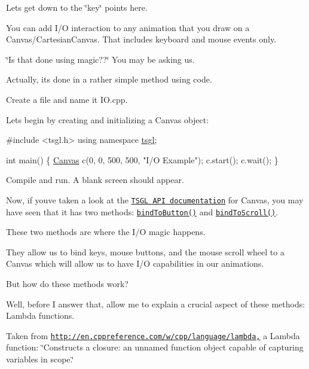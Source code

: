 Let\textquotesingle{}s get down to the \char`\"{}key\char`\"{} points here.

You can add I/\+O interaction to any animation that you draw on a Canvas/\+Cartesian\+Canvas. That includes keyboard and mouse events only.

\char`\"{}\+Is that done using magic??\char`\"{} You may be asking us.

Actually, it\textquotesingle{}s done in a rather simple method using code.

Create a file and name it I\+O.\+cpp.

Let\textquotesingle{}s begin by creating and initializing a Canvas object\+:


\begin{DoxyCode}
\textcolor{preprocessor}{#include <tsgl.h>}
\textcolor{keyword}{using namespace }\hyperlink{namespacetsgl}{tsgl};

\textcolor{keywordtype}{int} main() \{
  \hyperlink{classtsgl_1_1_canvas}{Canvas} c(0, 0, 500, 500, \textcolor{stringliteral}{"I/O Example"});
  c.start();
  c.wait();
\}
\end{DoxyCode}


Compile and run. A blank screen should appear.

Now, if you\textquotesingle{}ve taken a look at the \href{http://calvin-cs.github.io/TSGL/html/index.html}{\tt T\+S\+G\+L A\+P\+I documentation} for Canvas, you may have seen that it has two methods\+: \href{http://calvin-cs.github.io/TSGL/html/classtsgl_1_1_canvas.html#a26f2f1acf2b80eee95e42bc13dbc7600}{\tt bind\+To\+Button()} and \href{http://calvin-cs.github.io/TSGL/html/classtsgl_1_1_canvas.html#aecd3d94790d2e660db380a5e951ae394}{\tt bind\+To\+Scroll()}.

These two methods are where the I/\+O magic happens.

They allow us to bind keys, mouse buttons, and the mouse scroll wheel to a Canvas which will allow us to have I/\+O capabilities in our animations.

But how do these methods work?

Well, before I answer that, allow me to explain a crucial aspect of these methods\+: Lambda functions.

Taken from \href{http://en.cppreference.com/w/cpp/language/lambda,}{\tt http\+://en.\+cppreference.\+com/w/cpp/language/lambda,} a Lambda function\+: \char`\"{}\+Constructs a closure\+: an unnamed function object capable of capturing variables in scope.\char`\"{}

